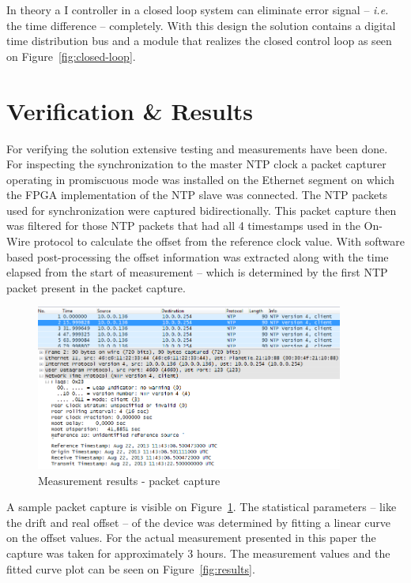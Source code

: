 \documentclass[article]{IEEEtran}
\begin{document}
In theory a I controller in a closed loop system can eliminate error signal -- \emph{i.e.} the time difference -- completely.
With this design the solution contains a digital time distribution bus and a module that realizes the 
closed control loop as seen on Figure~\ref{fig:closed-loop}.

\section{Verification \& Results}


For verifying the solution extensive testing and measurements have been done. For inspecting the synchronization 
to the master NTP clock a packet capturer operating in promiscuous mode was installed on the Ethernet segment on which the FPGA implementation
of the NTP slave was connected. The NTP packets used for synchronization were captured bidirectionally. This packet
capture then was filtered for those NTP packets that had all 4 timestamps used in the On-Wire protocol to calculate the 
offset from the reference clock value. With software based post-processing the offset information was extracted along with the time elapsed from 
the start of measurement -- which is determined by the first NTP packet present in the packet capture.

\begin{figure}[!htb]
    \centering
    \includegraphics[width=0.9\textwidth]{figures_raw/pcap-NTP.png}
    \caption{Measurement results - packet capture}
    \label{fig:pcap-NTP}
\end{figure}



A sample packet capture is visible on Figure~\ref{fig:pcap-NTP}. The statistical parameters -- like the drift and real offset -- of the device was determined by
fitting a linear curve on the offset values. For the actual measurement presented in this paper the capture was taken for approximately 3 hours. 
The measurement values and the fitted curve plot can be seen on Figure~\ref{fig:results}.
\end{document}
